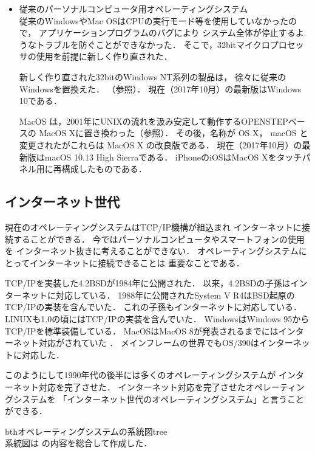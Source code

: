 \begin{enumerate}
\begin{itemize}
\item 従来のパーソナルコンピュータ用オペレーティングシステム \\
従来のWindowsやMac OSはCPUの実行モード等を使用していなかったので，
アプリケーションプログラムのバグにより
システム全体が停止するようなトラブルを防ぐことができなかった．
そこで，32bitマイクロプロセッサの使用を前提に新しく作り直された．

新しく作り直された32bitのWindows NT系列の製品は，
徐々に従来のWindowsを置換えた．
（参照）．
現在（2017年10月）の最新版はWindows 10である．

MacOS は，2001年にUNIXの流れを汲み安定して動作するOPENSTEPベースの
MacOS X\cite{macos}に置き換わった（参照）．
その後，名称が OS X， macOS と変更されたがこれらは MacOS X の改良版である．
現在（2017年10月）の最新版はmacOS 10.13 High Sierraである．
iPhoneのiOSはMacOS Xをタッチパネル用に再構成したものである\cite{ios}．
\end{itemize}
\end{enumerate}

\subsection{インターネット世代}
現在のオペレーティングシステムはTCP/IP機構が組込まれ
インターネットに接続することができる．
今ではパーソナルコンピュータやスマートフォンの使用を
インターネット抜きに考えることができない．
オペレーティングシステムにとってインターネットに接続できることは
重要なことである．

TCP/IPを実装した4.2BSDが1984年に公開された\cite{bsd}．
以来，4.2BSDの子孫はインターネットに対応している．
1988年に公開されたSystem V R4はBSD起原のTCP/IPの実装を含んでいた\cite{svr4}．
これの子孫もインターネットに対応している．
LINUXも1.0の頃にはTCP/IPの実装を含んでいた\cite{linux1}．
WindowsはWindows 95からTCP/IPを標準装備している\cite{windows}．
MacOSはMacOS 8が発表されるまでにはインターネット対応がされていた
\cite{classicmacos}．
メインフレームの世界でもOS/390はインターネットに対応した\cite{os390}．

このようにして1990年代の後半には多くのオペレーティングシステムが
インターネット対応を完了させた．
インターネット対応を完了させたオペレーティングシステムを
「インターネット世代のオペレーティングシステム」と言うことができる．

\begin{myfig}{bth}{オペレーティングシステムの系統図}{tree}
 \\
{\small
系統図は\cite{os360,
mvs,
os390,
zos,
unix,
solaris,
aix,
mach,
bsd,
bsdd,
386bsd,
freebsd,
freenas,
nextstep,
classicmacos,
dynabook,
macos,
ios,
linux,
android,
msdos,
windows}
の内容を総合して作成した．}
\end{myfig}
